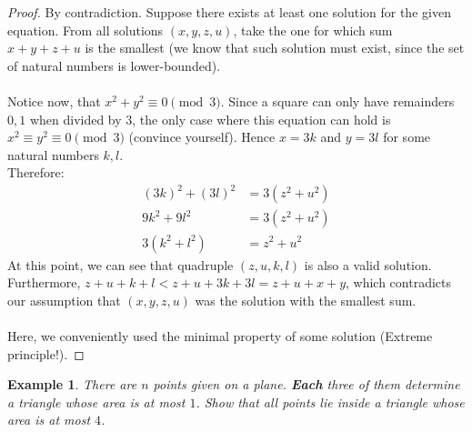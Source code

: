 \documentclass{article}
\newtheorem{theorem}{Example}
\begin{document}
\begin{proof}
By contradiction. Suppose there exists at least one solution for the given equation. From all solutions $(x, y, z, u)$, take the one for which sum $x + y + z + u$ is the smallest (we know that such solution must exist, since the set of natural numbers is lower-bounded). \\\\
Notice now, that $x^{2} + y^{2} \equiv 0 \pmod 3$. Since a square can only have remainders $0, 1$ when divided by $3$, the only case where this equation can hold is $x^{2} \equiv y^{2} \equiv 0 \pmod 3$ (convince yourself). Hence $x = 3k$ and $y = 3l$ for some natural numbers $k, l$. \\
Therefore:
\begin{align*}
{(3k)}^{2} + {(3l)}^{2} &= 3(z^{2} + u^{2})\\
9k^{2} + 9l^{2} &= 3(z^{2} + u^{2}) \\
3(k^{2} + l^{2}) &= z^{2} + u^{2}
\end{align*}
At this point, we can see that quadruple $(z, u, k, l)$ is also a valid solution. Furthermore, $z + u + k + l < z + u + 3k + 3l = z + u + x + y$, which contradicts our assumption that $(x, y, z, u)$ was the solution with the smallest sum. \qedhere
\\\\
Here, we conveniently used the minimal property of some solution (Extreme principle!).
\end{proof}

\begin{theorem}
There are $n$ points given on a plane. \textbf{Each} three of them determine a triangle whose area is at most $1$. Show that all points lie inside a triangle whose area is at most $4$.
\end{theorem}
\end{document}
